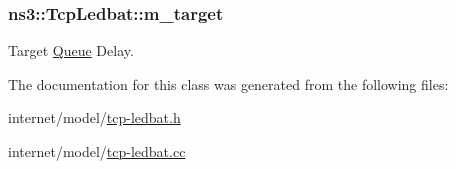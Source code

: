 \subsubsection[{\texorpdfstring{m\+\_\+target}{m_target}}]{ ns3\+::\+Tcp\+Ledbat\+::m\+\_\+target\hspace{0.3cm}{\ttfamily [private]}}\hypertarget{classns3_1_1TcpLedbat_a93ab2886c4bbbcec5a6efd192c437fb7}{}\label{classns3_1_1TcpLedbat_a93ab2886c4bbbcec5a6efd192c437fb7}


Target \hyperlink{classns3_1_1Queue}{Queue} Delay. 



The documentation for this class was generated from the following files\+:\begin{DoxyCompactItemize}
\item 
internet/model/\hyperlink{tcp-ledbat_8h}{tcp-\/ledbat.\+h}\item 
internet/model/\hyperlink{tcp-ledbat_8cc}{tcp-\/ledbat.\+cc}\end{DoxyCompactItemize}
